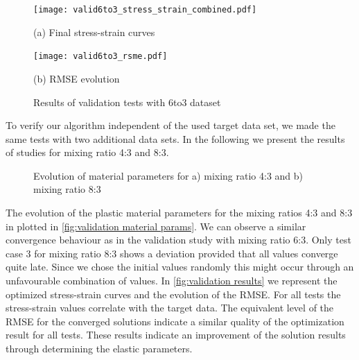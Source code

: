     
    \begin{figure}
        \centering
        \begin{minipage}[t]{0.47\textwidth}
            \centering
            \texttt{[image: valid6to3\_stress\_strain\_combined.pdf]}
            \caption*{(a) Final stress-strain curves}
            \label{fig:validationStressStrain6to3}
        \end{minipage}
        \hfill
        \begin{minipage}[t]{0.47\textwidth}
            \centering
            \texttt{[image: valid6to3\_rsme.pdf]}
            \caption*{(b) RMSE evolution}
            \label{subfigure:validation-rmse-6to3}
        \end{minipage}
        \caption{Results of validation tests with 6to3 dataset}
        \label{fig:validation results 6to3}
    \end{figure}
    


    To verify our algorithm independent of the used target data set, we made the same tests with two additional data sets. In the following we present the results of studies for mixing ratio 4:3 and 8:3. 

    \begin{figure}[H]
        \centering
        \caption{Evolution of material parameters for a) mixing ratio 4:3 and b) mixing ratio 8:3}
        \label{fig:validation material params}
    \end{figure}

    The evolution of the plastic material parameters for the mixing ratios 4:3 and 8:3 in plotted in \autoref{fig:validation material params}. We can observe a similar convergence behaviour as in the validation study with mixing ratio 6:3. Only test case 3 for mixing ratio 8:3 shows a deviation provided that all values converge quite late. Since we chose the initial values randomly this might occur through an unfavourable combination of values. 
    In \autoref{fig:validation results} we represent the optimized stress-strain curves and the evolution of the RMSE. For all tests the stress-strain values correlate with the target data. The equivalent level of the RMSE for the converged solutions indicate a similar quality of the optimization result for all tests. These results indicate an improvement of the solution results through determining the elastic parameters.
     
